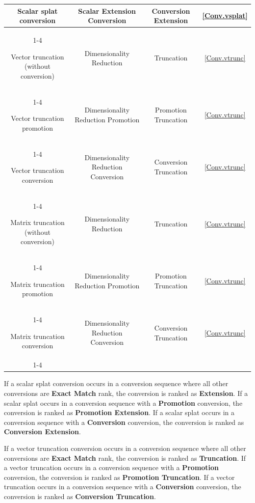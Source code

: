 \begin{center}
\begin{tabular}{|| c | c | c | c ||}
    Scalar splat conversion & Scalar Extension Conversion & Conversion Extension
          & \ref{Conv.vsplat} \\ \cline{1-4}

    Vector truncation (without conversion) & Dimensionality Reduction
          & Truncation & \ref{Conv.vtrunc} \\ \cline{1-4}

    Vector truncation promotion & Dimensionality Reduction Promotion
          & Promotion Truncation & \ref{Conv.vtrunc} \\ \cline{1-4}

    Vector truncation conversion & Dimensionality Reduction Conversion
          & Conversion Truncation & \ref{Conv.vtrunc} \\ \cline{1-4}

    Matrix truncation (without conversion) & Dimensionality Reduction
          & Truncation & \ref{Conv.vtrunc} \\ \cline{1-4}

    Matrix truncation promotion & Dimensionality Reduction Promotion
          & Promotion Truncation & \ref{Conv.vtrunc} \\ \cline{1-4}

    Matrix truncation conversion & Dimensionality Reduction Conversion
          & Conversion Truncation & \ref{Conv.vtrunc} \\ \cline{1-4}
    \hline
  \end{tabular}
\end{center}

\p If a scalar splat conversion occurs in a conversion sequence where all other
conversions are \textbf{Exact Match} rank, the conversion is ranked as
\textbf{Extension}. If a scalar splat occurs in a conversion
sequence with a \textbf{Promotion} conversion, the conversion is ranked as
\textbf{Promotion Extension}. If a scalar splat occurs in a conversion
sequence with a \textbf{Conversion} conversion, the conversion is ranked as
\textbf{Conversion Extension}.

\p If a vector truncation conversion occurs in a conversion sequence where all
other conversions are \textbf{Exact Match} rank, the conversion is ranked as
\textbf{Truncation}. If a vector truncation occurs in a conversion
sequence with a \textbf{Promotion} conversion, the conversion is ranked as
\textbf{Promotion Truncation}. If a vector truncation occurs in a conversion
sequence with a \textbf{Conversion} conversion, the conversion is ranked as
\textbf{Conversion Truncation}.

